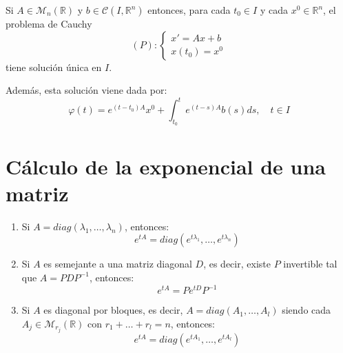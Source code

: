 \begin{corollary}
    Si $A \in \mathcal{M}_n(\mathbb{R})$ y $b \in \mathcal{C}(I, \mathbb{R}^n)$ entonces, para cada $t_0 \in I$ y cada $x^0 \in \mathbb{R}^n$, el problema de Cauchy
    $$(P): \begin{cases}
            x' = Ax + b \\
            x(t_0) = x^0
        \end{cases}$$
    tiene solución única en $I$.

    Además, esta solución viene dada por:
    $$\varphi(t) = e^{(t-t_0)A}x^0 + \int_{t_0}^t e^{(t-s)A}b(s)ds, \quad t \in I$$
\end{corollary}

\section{Cálculo de la exponencial de una matriz}
\begin{enumerate}
    \item Si $A = diag(\lambda_1, \dots, \lambda_n)$, entonces:
          $$e^{tA} = diag(e^{t\lambda_1}, \dots, e^{t\lambda_n})$$
    \item Si $A$ es semejante a una matriz diagonal $D$, es decir, existe $P$ invertible tal que $A = PDP^{-1}$, entonces:
          $$e^{tA} = Pe^{tD}P^{-1}$$
    \item Si $A$ es diagonal por bloques, es decir, $A = diag(A_1, \dots, A_l)$ siendo cada $A_j \in \mathcal{M}_{r_j}(\mathbb{R})$ con $r_1 + \dots + r_l = n$, entonces:
          $$e^{tA} = diag(e^{tA_1}, \dots, e^{tA_l})$$
\end{enumerate}